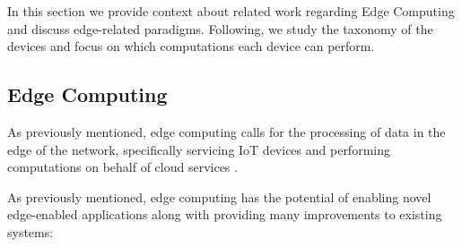 
In this section we provide context about related work regarding Edge Computing and discuss edge-related paradigms. Following, we study the taxonomy of the devices and focus on which computations each device can perform.

\subsection{Edge Computing}

As previously mentioned, edge computing calls for the processing of data in the edge of the network, specifically servicing IoT devices and performing computations on behalf of cloud services \cite{7488250}.

As previously mentioned, edge computing has the potential of enabling novel edge-enabled applications along with providing many improvements to existing systems:

